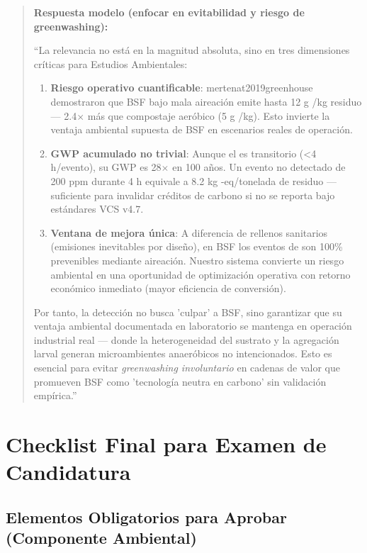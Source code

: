 \documentclass[12pt,oneside]{book}
\begin{document}
\begin{quote}
\textbf{Respuesta modelo (enfocar en evitabilidad y riesgo de greenwashing):}

``La relevancia no está en la magnitud absoluta, sino en tres dimensiones críticas para Estudios Ambientales:

\begin{enumerate}
    \item \textbf{Riesgo operativo cuantificable}: mertenat2019greenhouse demostraron que BSF bajo mala aireación emite hasta 12 g /kg residuo --- 2.4$\times$ más que compostaje aeróbico (5 g /kg). Esto invierte la ventaja ambiental supuesta de BSF en escenarios reales de operación.
    
    \item \textbf{GWP acumulado no trivial}: Aunque el  es transitorio (<4 h/evento), su GWP es 28$\times$  en 100 años. Un evento no detectado de 200 ppm durante 4 h equivale a 8.2 kg -eq/tonelada de residuo --- suficiente para invalidar créditos de carbono si no se reporta bajo estándares VCS v4.7.
    
    \item \textbf{Ventana de mejora única}: A diferencia de rellenos sanitarios (emisiones inevitables por diseño), en BSF los eventos de  son 100\% prevenibles mediante aireación. Nuestro sistema convierte un riesgo ambiental en una oportunidad de optimización operativa con retorno económico inmediato (mayor eficiencia de conversión).
\end{enumerate}

Por tanto, la detección no busca 'culpar' a BSF, sino garantizar que su ventaja ambiental documentada en laboratorio se mantenga en operación industrial real --- donde la heterogeneidad del sustrato y la agregación larval generan microambientes anaeróbicos no intencionados. Esto es esencial para evitar \textit{greenwashing involuntario} en cadenas de valor que promueven BSF como 'tecnología neutra en carbono' sin validación empírica.''
\end{quote}

\chapter{Checklist Final para Examen de Candidatura}

\section{Elementos Obligatorios para Aprobar (Componente Ambiental)}
\end{document}
